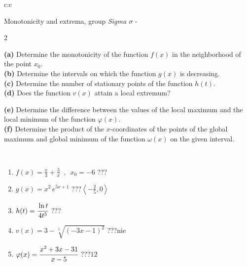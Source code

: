 \documentclass[10pt]{report}
\begin{document}
\begin{tabular}{c:c}
\begin{minipage}[c][104.5mm][t]{0.5\linewidth}
\begin{center}
\vspace{5mm}
{\huge Monotonicity and extrema, group \textit{Sigma $\sigma$} -}\\[5mm]
\begin{minipage}{0.95\linewidth}
\begin{center}
{\small \begin{multicols}{2} \raggedright
\textbf{(a)} Determine the monotonicity of the function \(f(x)\) in the neighborhood of the point \(x_0\). \\[1mm]
\textbf{(b)} Determine the intervals on which the function \(g(x)\) is decreasing. \\[1mm]
\textbf{(c)} Determine the number of stationary points of the function \(h(t)\). \\[1mm]
\textbf{(d)} Does the function \(v(x)\) attain a local extremum? \par \columnbreak
\textbf{(e)} Determine the difference between the values of the local maximum and the local minimum of the function \(\varphi(x)\). \\[1mm]
\textbf{(f)} Determine the product of the \(x\)-coordinates of the points of the global maximum and global minimum of the function \(\omega(x)\) on the given interval. \\[1mm]
\end{multicols}
}
\end{center}
\end{minipage}
\\[1mm]
\begin{minipage}{0.79\linewidth}
\begin{center}
\begin{varwidth}{\linewidth}
\setlength{\itemsep}{0pt}
\begin{enumerate}
\normalsize
\item $f(x)=\frac{x}{3}+\frac{3}{x} \enspace , \enspace x_0=-6$\quad \dotfill\; ???\;\dotfill \quad {}
\item $g(x)=x^2\, e^{5x+1}$\quad \dotfill\; ???\;\dotfill \quad $\left\langle-\frac{2}{5} , 0\right\rangle$
\item $h(t)=\cfrac{\ln t}{4t^5}$\quad \dotfill\; ???\;\dotfill {}
\item $v(x)=3-\sqrt[5]{(-3x-1)^2}$\quad \dotfill\; ???\;\dotfill \quad $\text{nie}$
\item $\varphi(x)=\cfrac{x^2+3x-31}{x-5}$\quad \dotfill\; ???\;\dotfill \quad $12$

\end{enumerate}
\end{varwidth}
\end{center}
\end{minipage}
\end{center}
\end{minipage}
\end{tabular}
\end{document}
